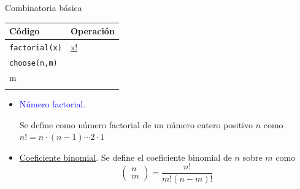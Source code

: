 \documentclass[
  ignorenonframetext,
]{beamer}
\newcommand\blue[1]{\textcolor{blue}{#1}}
\begin{document}
\begin{frame}[fragile]{Combinatoria básica}
\label{combinatoria-buxe1sica}
\begin{longtable}[]{@{}ll@{}}
\toprule\noalign{}
Código & Operación \\
\midrule\noalign{}
\endhead
\texttt{factorial(x)} &
\href{https://es.wikipedia.org/wiki/Factorial}{x!} \\
\texttt{choose(n,m)} & \(\begin{pmatrix}n\\ m\end{pmatrix}\) \\
\bottomrule\noalign{}
\end{longtable}

\vspace{0.2cm}

\begin{itemize}
\item
  \blue{Número factorial.}

  Se define como número factorial de un número entero positivo \(n\)
  como \(n!=n\cdot(n-1)\cdots 2\cdot 1\)
\item
  \href{https://es.wikipedia.org/wiki/Coeficiente_binomial}{Coeficiente
  binomial}. Se define el coeficiente binomial de \(n\) sobre \(m\) como
  \[\begin{pmatrix}n\\ m\end{pmatrix}=\frac{n!}{m!(n-m)!}\]
\end{itemize}
\end{frame}
\end{document}
